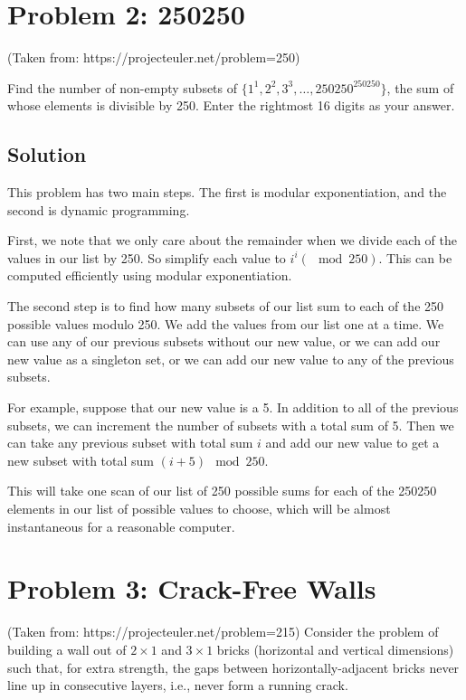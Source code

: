 \normalfont\documentclass[letterpaper,11pt]{article}
\begin{document}
\newpage


\section*{Problem 2: 250250}
(Taken from: https://projecteuler.net/problem=250) \newline

Find the number of non-empty subsets of $\{1^1, 2^2, 3^3, \ldots, 250250^{250250}\}$, the sum of whose elements is divisible by 250. Enter the rightmost 16 digits as your answer.


\subsection*{Solution}
This problem has two main steps. The first is modular exponentiation, and the second is dynamic programming.

First, we note that we only care about the remainder when we divide each of the values in our list by 250. So simplify each value to $i^i (\mod 250)$. This can be computed efficiently using modular exponentiation.

The second step is to find how many subsets of our list sum to each of the 250 possible values modulo 250. We add the values from our list one at a time. We can use any of our previous subsets without our new value, or we can add our new value as a singleton set, or we can add our new value to any of the previous subsets.

For example, suppose that our new value is a 5. In addition to all of the previous subsets, we can increment the number of subsets with a total sum of 5. Then we can take any previous subset with total sum $i$ and add our new value to get a new subset with total sum $(i + 5) \mod 250$.

This will take one scan of our list of 250 possible sums for each of the 250250 elements in our list of possible values to choose, which will be almost instantaneous for a reasonable computer.

\section*{Problem 3: Crack-Free Walls}
(Taken from: https://projecteuler.net/problem=215) \newline
Consider the problem of building a wall out of $2 \times 1$ and $3 \times 1$ bricks (horizontal and vertical dimensions) such that, for extra strength, the gaps between horizontally-adjacent bricks never line up in consecutive layers, i.e., never form a running crack.
\end{document}
